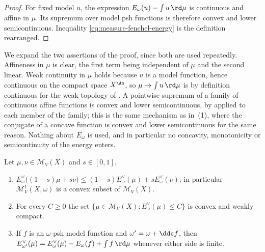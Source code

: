 \begin{proof}
For fixed model \(u\), the expression
\(E_\omega(u)-\int u\,\rd \mu\) is continuous and affine in \(\mu\).
Its supremum over model psh functions is therefore convex and lower
semicontinuous.  Inequality \eqref{eq:measure-fenchel-energy} is the
definition rearranged.
\end{proof}

We expand the two assertions of the proof, since both are used repeatedly.
Affineness in \(\mu\) is clear, the first term being independent of \(\mu\)
and the second linear.  Weak continuity in \(\mu\) holds because \(u\) is a
model function, hence continuous on the compact space \(X^{\An}\), so
\(\mu\mapsto\int u\,\rd\mu\) is by definition continuous for the weak
topology of .  A pointwise supremum of a family of
continuous affine functions is convex and lower semicontinuous, by
 applied to each member of the family; this is
the same mechanism as in \,(1), where the
conjugate of a concave function is convex and lower semicontinuous for the
same reason.  Nothing about \(E_\omega\) is used, and in particular no
concavity, monotonicity or semicontinuity of the energy enters.

\begin{proposition}
\label{prop:ch28-dual-order}
Let \(\mu,\nu\in\mathcal M_V(X)\) and \(s\in[0,1]\).
\begin{enumerate}
\item\label{itm:ch28-dual:convex}
 \(E^\vee_\omega\bigl((1-s)\mu+s\nu\bigr)\leq
 (1-s)E^\vee_\omega(\mu)+sE^\vee_\omega(\nu)\); in particular
 \(\mathcal M^1_V(X,\omega)\) is a convex subset of \(\mathcal M_V(X)\).
\item\label{itm:ch28-dual:sublevel}
 For every \(C\geq0\) the set
 \(\{\mu\in\mathcal M_V(X):E^\vee_\omega(\mu)\leq C\}\) is convex and weakly
 compact.
\item\label{itm:ch28-dual:reference}
 If \(f\) is an \(\omega\)-psh model function and \(\omega'=\omega+\ddc f\),
 then \(E^{\vee}_{\omega'}(\mu)=E^\vee_\omega(\mu)-E_\omega(f)
 +\int f\,\rd\mu\) whenever either side is finite.
\end{enumerate}
\end{proposition}

